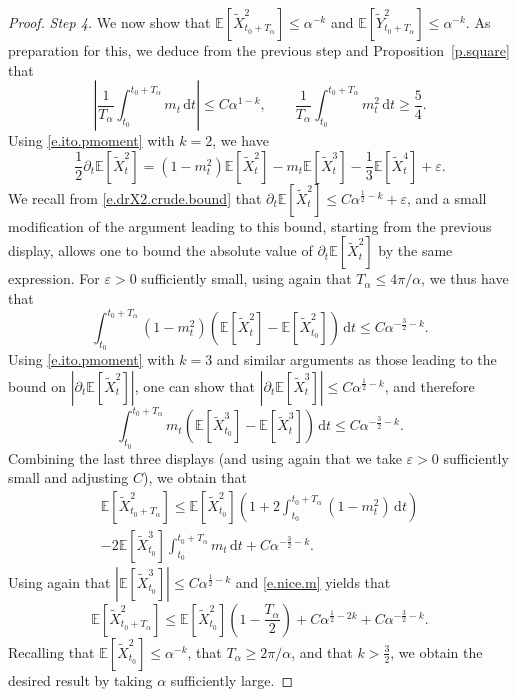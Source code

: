 \documentclass[10pt,a4paper]{amsart}
\newcommand{\E}{\mathbb E}
\newcommand{\Ll}{\left}
\newcommand{\Rr}{\right}
\newcommand{\al}{\alpha}
\newcommand{\dr}{\partial}
\newcommand{\ep}{\varepsilon}
\newcommand{\td}{\widetilde}
\renewcommand{\d}{\mathrm{d}}
\renewcommand{\ge}{\geqslant}
\renewcommand{\le}{\leqslant}
\begin{document}
\begin{proof}
\noindent \emph{Step 4.} We now show that $\E[\td X_{t_0 + T_\al}^2] \le \al^{-k}$ and $\E[\td Y_{t_0 + T_\al}^2] \le \al^{-k}$. As preparation for this, we deduce from the previous step and Proposition~\ref{p.square} that
\begin{equation}  
\label{e.nice.m}
\Ll| \frac 1 {T_\al} \int_{t_0}^{t_0 + T_\al} m_t \, \d t \Rr| \le C \al^{1-k}, \qquad \frac 1 {T_\al} \int_{t_0}^{t_0 + T_\al} m_t^2 \, \d t \ge \frac 5 4.
\end{equation}
Using \eqref{e.ito.pmoment} with $k = 2$, we have
\begin{equation*}  %
\frac 1 2 \dr_t \E[\td X_t^2] = (1-m_t^2) \E[\td X_t^2] - m_t \E[\td X_t^3] - \frac 1 3 \E[\td X_t^4] + \ep.
\end{equation*}
We recall from \eqref{e.drX2.crude.bound} that $\dr_t \E[\td X_t^2] \le C \al^{\frac 1 2 - k} + \ep$, and a small modification of the argument leading to this bound, starting from the previous display, allows one to bound the absolute value of $\dr_t \E[\td X_t^2]$ by the same expression. For $\ep > 0$ sufficiently small, using again that $T_\al \le 4\pi/\al$, we thus have that
\begin{equation*}  %
\int_{t_0}^{t_0 + T_\al}(1-m_t^2)\Ll( \E[\td X_t^2] - \E[\td X_{t_0}^2]\Rr)\, \d t \le C \al^{-\frac 3 2 - k}.
\end{equation*}
Using \eqref{e.ito.pmoment} with $k = 3$ and similar arguments as those leading to the bound on $|\dr_t \E[\td X_t^2]|$, one can show that $|\dr_t \E[\td X_t^3]| \le C \al^{\frac 1 2 - k}$, and therefore
\begin{equation*}  %
\int_{t_0}^{t_0 + T_\al} m_t \Ll( \E[\td X_{t_0}^3] - \E[\td X_{t}^3] \Rr) \, \d t \le C \al^{-\frac 3 2 - k}.
\end{equation*}
Combining the last three displays (and using again that we take $\ep > 0$ sufficiently small and adjusting $C$), we obtain that 
\begin{multline*}  %
\E[\td X_{t_0 + T_\al}^2] 
\le \E[\td X_{t_0}^2]\Ll(1 + 2 \int_{t_0}^{t_0 + T_\al} (1-m_t^2)\, \d t \Rr) 
\\
- 2 \E[\td X_{t_0}^3] \int_{t_0}^{t_0 + T_\al} m_t \, \d t + C \al^{-\frac 3 2 - k}.
\end{multline*}
Using again that $|\E[\td X_{t_0}^3]| \le C \al^{\frac 1 2 - k}$ and \eqref{e.nice.m} yields that
\begin{equation*}  %
\E[\td X_{t_0 + T_\al}^2] \le \E[\td X_{t_0}^2] \Ll( 1 - \frac{T_\al}{2} \Rr) + C \al^{\frac 1 2 - 2k} + C \al^{-\frac 3 2 - k}.
\end{equation*}
Recalling that $\E[\td X_{t_0}^2] \le \al^{-k}$, that $T_\al \ge 2\pi/\al$, and that $k > \frac 3 2$, we obtain the desired result by taking $\al$ sufficiently large.
\end{proof}
\end{document}
